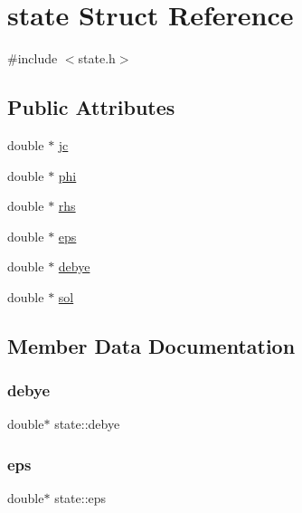 \hypertarget{structstate}{}\section{state Struct Reference}
\label{structstate}


{\ttfamily \#include $<$state.\+h$>$}

\subsection*{Public Attributes}
\begin{DoxyCompactItemize}
\item 
double $\ast$ \mbox{\hyperlink{structstate_a4d5cdf77138b2c40a0bf0ada34b56e28}{jc}}
\item 
double $\ast$ \mbox{\hyperlink{structstate_a093d6660cfdace12931fbf71916f1219}{phi}}
\item 
double $\ast$ \mbox{\hyperlink{structstate_af7c4d54188350e15b8c810650d8e5fde}{rhs}}
\item 
double $\ast$ \mbox{\hyperlink{structstate_a79057f53b3ae499aa3b9fd2b18467f88}{eps}}
\item 
double $\ast$ \mbox{\hyperlink{structstate_a4d052faf23e2396734c55e1db2b3768b}{debye}}
\item 
double $\ast$ \mbox{\hyperlink{structstate_a21f26bbebef43d95673250899d3bcda8}{sol}}
\end{DoxyCompactItemize}


\subsection{Member Data Documentation}
\mbox{\label{structstate_a4d052faf23e2396734c55e1db2b3768b}} 
\subsubsection{\texorpdfstring{debye}{debye}}
{\footnotesize\ttfamily double$\ast$ state\+::debye}

\mbox{\label{structstate_a79057f53b3ae499aa3b9fd2b18467f88}} 
\subsubsection{\texorpdfstring{eps}{eps}}
{\footnotesize\ttfamily double$\ast$ state\+::eps}

